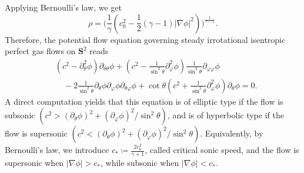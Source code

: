\documentclass[reqno,12pt]{amsart}
\numberwithin{equation}{section}
\begin{document}
Applying Bernoulli's law, we get 
\begin{equation}\label{rho with phi}
    \rho=\Big(\frac{1}{\gamma}(c^2_0-\frac{1}{2}(\gamma-1)|\nabla \phi|^2)\Big)^{\frac{1}{\gamma-1}}.
\end{equation}
Therefore, the potential flow equation governing steady irrotational isentropic perfect gas flows on $\mathbf{S}^2$ reads
\begin{align}\label{potential flow in s2}
	&(c^2-\partial^2_\theta\phi)\partial_{\theta\theta}\phi+(c^2-\frac{1}{\sin^2\theta }\partial^2_\varphi\phi)\frac{1}{\sin^2\theta }\partial_{\varphi\varphi}\phi\nonumber\\
	&\quad-2\frac{1}{\sin^2\theta }\partial_{\theta}\phi\partial_{\varphi}\phi\partial_{\theta\varphi}\phi+\cot\theta(c^2+\frac{1}{\sin^2\theta }\partial^2_\varphi\phi)\partial_{\theta}\phi=0.
\end{align}
A direct computation yields that
this equation is of elliptic type if the flow is subsonic $(c^2 > (\partial_\theta\phi)^2 +(\partial_\varphi\phi)^2/\sin^2\theta)$,
and is of hyperbolic type if the flow is supersonic  $(c^2 < (\partial_\theta\phi)^2 +(\partial_\varphi\phi)^2/\sin^2\theta)$. Equivalently, by Bernoulli's law, we introduce $c_*\coloneqq\frac{2c^2_0}{\gamma+1}$, called critical sonic speed, and the flow is supersonic when $|\nabla\phi|>c_*$, while subsonic when $|\nabla\phi|<c_*$.
	
\end{document}
